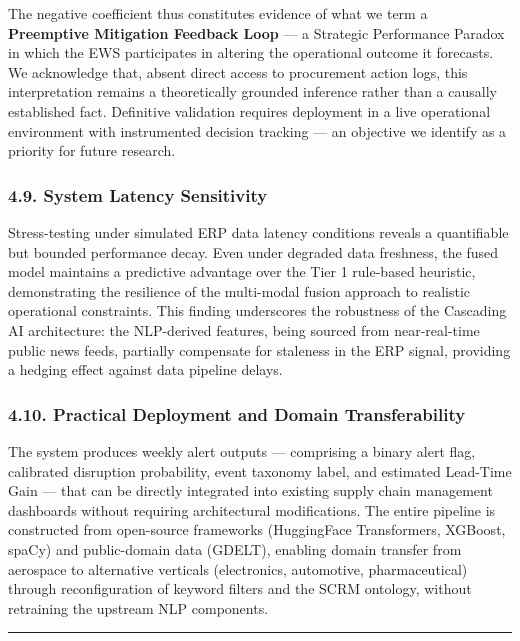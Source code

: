 \documentclass[conference]{IEEEtran}
\begin{document}
The negative coefficient thus constitutes evidence of what we term a
\textbf{Preemptive Mitigation Feedback Loop} --- a Strategic Performance
Paradox in which the EWS participates in altering the operational
outcome it forecasts. We acknowledge that, absent direct access to
procurement action logs, this interpretation remains a theoretically
grounded inference rather than a causally established fact. Definitive
validation requires deployment in a live operational environment with
instrumented decision tracking --- an objective we identify as a
priority for future research.

\subsubsection{4.9. System Latency
Sensitivity}\label{system-latency-sensitivity}

Stress-testing under simulated ERP data latency conditions reveals a
quantifiable but bounded performance decay. Even under degraded data
freshness, the fused model maintains a predictive advantage over the
Tier 1 rule-based heuristic, demonstrating the resilience of the
multi-modal fusion approach to realistic operational constraints. This
finding underscores the robustness of the Cascading AI architecture: the
NLP-derived features, being sourced from near-real-time public news
feeds, partially compensate for staleness in the ERP signal, providing a
hedging effect against data pipeline delays.

\subsubsection{4.10. Practical Deployment and Domain
Transferability}\label{practical-deployment-and-domain-transferability}

The system produces weekly alert outputs --- comprising a binary alert
flag, calibrated disruption probability, event taxonomy label, and
estimated Lead-Time Gain --- that can be directly integrated into
existing supply chain management dashboards without requiring
architectural modifications. The entire pipeline is constructed from
open-source frameworks (HuggingFace Transformers, XGBoost, spaCy) and
public-domain data (GDELT), enabling domain transfer from aerospace to
alternative verticals (electronics, automotive, pharmaceutical) through
reconfiguration of keyword filters and the SCRM ontology, without
retraining the upstream NLP components.

\begin{center}\rule{0.5\linewidth}{0.5pt}\end{center}
\end{document}
